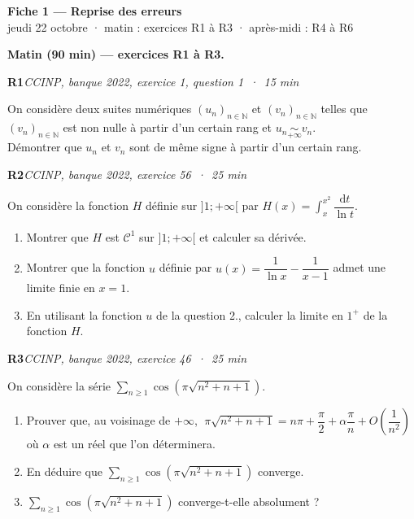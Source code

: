 \documentclass[11pt,a4paper]{article}
\newcommand{\N}{\mathbb{N}}
\newcommand{\dd}{\,\mathrm{d}}
\newcommand{\exo}[3]{\vspace{1.1em}\noindent\textbf{\large #1}\hfill\textit{#2 \,·\, #3}\par\smallskip}
\begin{document}
\begin{center}
{\LARGE\bfseries Fiche 1 — Reprise des erreurs}\\[0.3em]
{\large jeudi 22 octobre · matin : exercices R1 à R3 · après-midi : R4 à R6}
\end{center}

\noindent{}


\noindent\textbf{Matin (90 min) --- exercices R1 à R3.}

\exo{R1}{CCINP, banque 2022, exercice 1, question 1}{15 min}
\noindent On considère deux suites numériques $(u_n)_{n\in\N}$ et $(v_n)_{n\in\N}$ telles que $(v_n)_{n\in\N}$ est non nulle à partir d'un certain rang et $u_n \underset{+\infty}{\sim} v_n$.\\
Démontrer que $u_n$ et $v_n$ sont de même signe à partir d'un certain rang.

\exo{R2}{CCINP, banque 2022, exercice 56}{25 min}
\noindent On considère la fonction $H$ définie sur $]1;+\infty[$ par $H(x)=\displaystyle\int_x^{x^2}\dfrac{\dd t}{\ln t}$.
\begin{enumerate}
\item Montrer que $H$ est $\mathcal{C}^1$ sur $]1;+\infty[$ et calculer sa dérivée.
\item Montrer que la fonction $u$ définie par $u(x)=\dfrac{1}{\ln x}-\dfrac{1}{x-1}$ admet une limite finie en $x=1$.
\item En utilisant la fonction $u$ de la question 2., calculer la limite en $1^+$ de la fonction $H$.
\end{enumerate}

\exo{R3}{CCINP, banque 2022, exercice 46}{25 min}
\noindent On considère la série $\displaystyle\sum_{n\geqslant 1}\cos\!\left(\pi\sqrt{n^2+n+1}\right)$.
\begin{enumerate}
\item Prouver que, au voisinage de $+\infty$, $\;\pi\sqrt{n^2+n+1}=n\pi+\dfrac{\pi}{2}+\alpha\dfrac{\pi}{n}+O\!\left(\dfrac1{n^2}\right)\;$ où $\alpha$ est un réel que l'on déterminera.
\item En déduire que $\displaystyle\sum_{n\geqslant 1}\cos\!\left(\pi\sqrt{n^2+n+1}\right)$ converge.
\item $\displaystyle\sum_{n\geqslant 1}\cos\!\left(\pi\sqrt{n^2+n+1}\right)$ converge-t-elle absolument ?
\end{enumerate}
\end{document}
